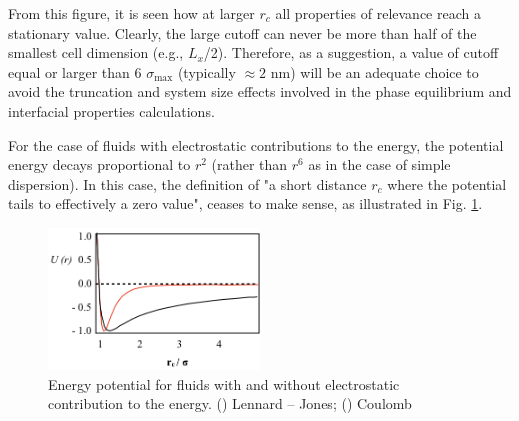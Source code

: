 \documentclass[9pt,tutorial]{livecoms}
\begin{document}
From this figure, it is seen how at larger $r_{c}$ all properties of
relevance reach a stationary value. Clearly, the large cutoff can never be more
than half of the smallest cell dimension (e.g., $L_{x}$/2).
Therefore, as a suggestion, a value of cutoff equal or larger than
6 ${\sigma}_{\mathrm{max}}$ (typically $\approx 2$ nm) will be an adequate choice to avoid the
truncation and system size effects involved in the phase equilibrium and
interfacial properties calculations.

For the case of fluids with electrostatic contributions to the energy, the
potential energy decays proportional to $r^{2}$ (rather than
$r^{6}$ as in the case of simple dispersion).
In this case, the definition of "a short distance $r_{c}$ where the
potential tails to effectively a zero value", ceases to make sense, as
illustrated in Fig. \ref{fig:6}. 

\begin{figure}
\includegraphics[width=0.5\textwidth]{gfx/image49.png}
\caption{Energy potential for fluids with and without electrostatic contribution to the energy. (\textcolor{color-3}{\textemdash}) Lennard -- Jones; (\textemdash) Coulomb}
\label{fig:6}
\end{figure}
\end{document}
